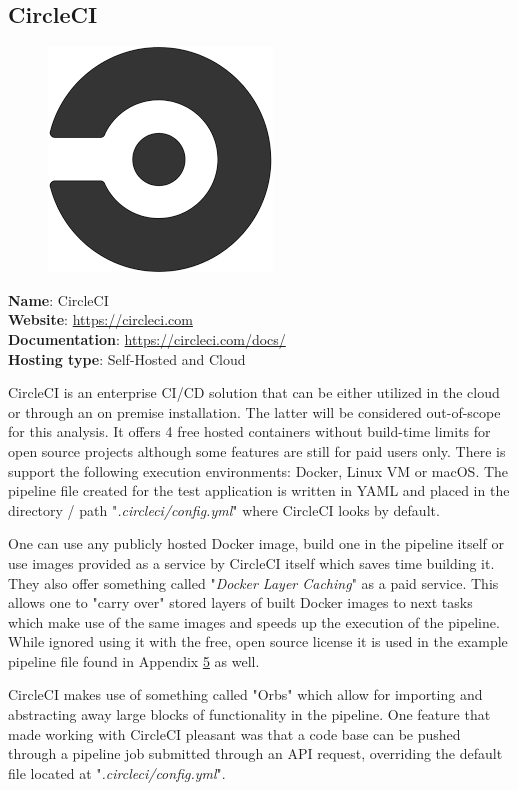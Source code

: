 \subsection{CircleCI}
\begin{figure}
    \vspace{-50pt}
    \includegraphics[width=.25\textwidth]{figures/brand/circleci2.png}  
    \vspace{-30pt}
\end{figure}
\textbf{Name}: CircleCI\\
\textbf{Website}: \url{https://circleci.com}\\
\textbf{Documentation}: \url{https://circleci.com/docs/}\\
\textbf{Hosting type}: Self-Hosted and Cloud

CircleCI is an enterprise CI/CD solution that can be either utilized in the cloud or through an on premise installation. The latter will be considered out-of-scope for this analysis. It offers 4 free hosted containers without build-time limits for open source projects although some features are still for paid users only. There is support the following execution environments: Docker, Linux VM or macOS. The pipeline file created for the test application is written in YAML and placed in the directory / path "\textit{.circleci/config.yml}" where CircleCI looks by default.

One can use any publicly hosted Docker image, build one in the pipeline itself or use images provided as a service by CircleCI itself which saves time building it. They also offer something called "\textit{Docker Layer Caching}" as a paid service. This allows one to "carry over" stored layers of built Docker images to next tasks which make use of the same images and speeds up the execution of the pipeline. While ignored using it with the free, open source license it is used in the example pipeline file found in Appendix \hyperref[chapter:appendix-circleci]{5} as well.

CircleCI makes use of something called "Orbs" which allow for importing and abstracting away large blocks of functionality in the pipeline. One feature that made working with CircleCI pleasant was that a code base can be pushed through a pipeline job submitted through an API request, overriding the default file located at "\textit{.circleci/config.yml}". 
\pagebreak

